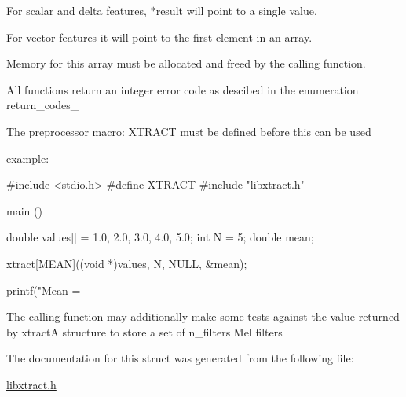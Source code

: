 For scalar and delta features, $\ast$result will point to a single value.

For vector features it will point to the first element in an array.

Memory for this array must be allocated and freed by the calling function.

All functions return an integer error code as descibed in the enumeration return\-\_\-codes\-\_\-

The preprocessor macro\-: X\-T\-R\-A\-C\-T must be defined before this can be used

example\-:\par
 \begin{DoxyVerb}#include <stdio.h>
#define XTRACT
#include "libxtract.h"

main () {
double values[] = {1.0, 2.0, 3.0, 4.0, 5.0};
int N = 5;
double mean;

xtract[MEAN]((void *)values, N, NULL, &mean);

printf("Mean = %
}
\end{DoxyVerb}
 The calling function may additionally make some tests against the value returned by xtract\-A structure to store a set of n\-\_\-filters Mel filters 

The documentation for this struct was generated from the following file\-:\begin{DoxyCompactItemize}
\item 
\hyperlink{libxtract_8h}{libxtract.\-h}\end{DoxyCompactItemize}
